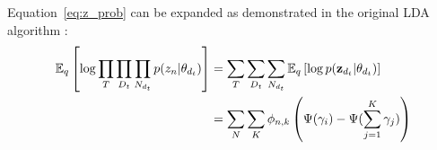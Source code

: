Equation~\ref{eq:z_prob} can be expanded as demonstrated in
the original LDA algorithm \citep{blei:2003}:
\begin{align}
  \mathbb{E}_q\left[ \log \prod_T \prod_{D_t} \prod_{N_{d_t}} p(z_n | \theta_{d_t}) \right]
  & = \sum_T \sum_{D_t} \sum_{N_{d_t}} \mathbb{E}_q\left[ \log p( \bold{z}_{d_t} | \theta_{d_t} ) \right]  \\  \nonumber
  & = \sum_N \sum_K \phi_{n,k} \left( \Psi(\gamma_i) - \Psi(\sum_{j=1}^K \gamma_j ) \right) \nonumber
\end{align}


